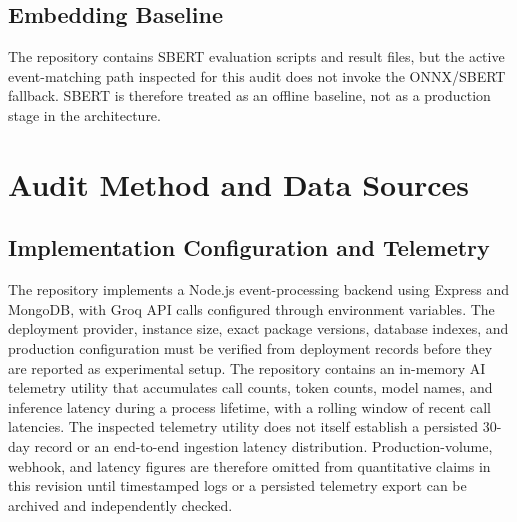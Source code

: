 \documentclass[conference]{IEEEtran}
\begin{document}
\subsection{Embedding Baseline}
The repository contains SBERT evaluation scripts and result files, but the active event-matching path inspected for this audit does not invoke the ONNX/SBERT fallback. SBERT is therefore treated as an offline baseline, not as a production stage in the architecture.

\section{Audit Method and Data Sources}

\subsection{Implementation Configuration and Telemetry}
The repository implements a Node.js event-processing backend using Express and MongoDB, with Groq API calls configured through environment variables. The deployment provider, instance size, exact package versions, database indexes, and production configuration must be verified from deployment records before they are reported as experimental setup. The repository contains an in-memory AI telemetry utility that accumulates call counts, token counts, model names, and inference latency during a process lifetime, with a rolling window of recent call latencies. The inspected telemetry utility does not itself establish a persisted 30-day record or an end-to-end ingestion latency distribution. Production-volume, webhook, and latency figures are therefore omitted from quantitative claims in this revision until timestamped logs or a persisted telemetry export can be archived and independently checked.

\begin{table}[!t]
\centering
\caption{Technology Stack Identified in the Repository}
\label{tab:tech}
\end{table}
\end{document}
